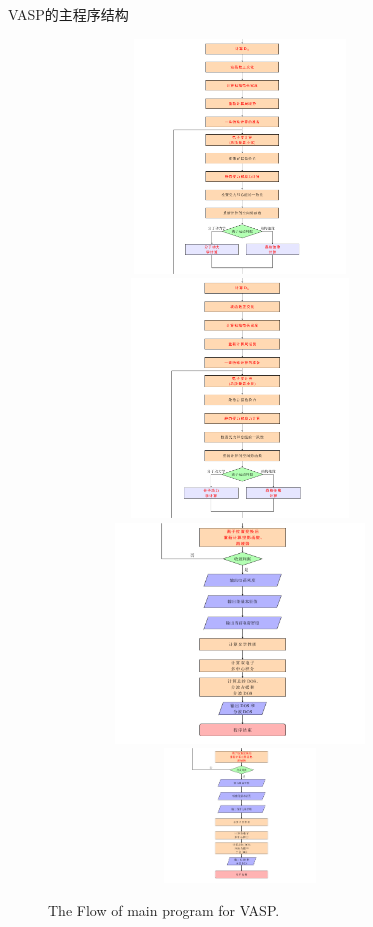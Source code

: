 \begin{frame}[allowframebreaks]{\textrm{VASP}的主程序结构}
\begin{figure}[h!]
\includegraphics[height=2.45in,width=4.0in,viewport=0 350 562 660,clip]{Figures/VASP_main_Flow-3.png}
\includegraphics[height=2.50in,width=4.0in,viewport=0 0 562 350,clip]{Figures/VASP_main_Flow-3.png}
\includegraphics[height=2.30in,width=4.0in,viewport=0 215 562 530,clip]{Figures/VASP_main_Flow-4.png}
\includegraphics[height=1.40in,width=4.0in,viewport=0 0 562 215,clip]{Figures/VASP_main_Flow-4.png}
\caption{\tiny \textrm{The Flow of main program for VASP.}}%
\label{FLOW_of_VASP}
\end{figure}
\end{frame}

